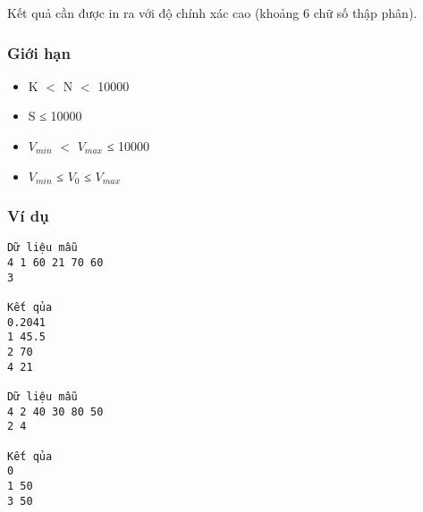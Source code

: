    Kết quả cần được in ra với độ chính xác cao (khoảng 6 chữ số thập phân).  

\subsubsection{   Giới hạn  }
\begin{itemize}
	\item     K $<$ N $<$ 10000   
	\item     S ≤ 10000   
	\item     $V_{min}$    $<$ $V_{max}$    ≤ 10000   
	\item     $V_{min}$    ≤ $V_{0}$    ≤ $V_{max}$
\end{itemize}

\subsubsection{   Ví dụ  }
\begin{verbatim}
Dữ liệu mẫu
4 1 60 21 70 60
3

Kết qủa
0.2041
1 45.5
2 70
4 21

Dữ liệu mẫu
4 2 40 30 80 50
2 4

Kết qủa
0
1 50
3 50
\end{verbatim}

